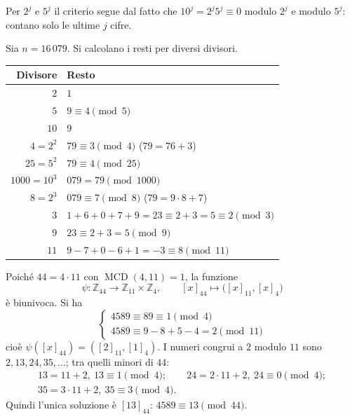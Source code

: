 \documentclass[11pt,a4paper]{article}
\begin{document}
\begin{osservazione}
Per $2^j$ e $5^j$ il criterio segue dal fatto che $10^j = 2^j 5^j \equiv 0$ modulo $2^j$ e modulo $5^j$: contano solo le ultime $j$ cifre.
\end{osservazione}

\begin{esempio}
Sia $n = 16\,079$. Si calcolano i resti per diversi divisori.
\begin{center}
\begin{tabular}{rl}
\toprule
Divisore & Resto \\
\midrule
$2$ & $1$ \\
$5$ & $9 \equiv 4 \pmod 5$ \\
$10$ & $9$ \\
$4 = 2^2$ & $79 \equiv 3 \pmod 4$ \quad ($79 = 76 + 3$) \\
$25 = 5^2$ & $79 \equiv 4 \pmod{25}$ \\
$1000 = 10^3$ & $079 = 79 \pmod{1000}$ \\
$8 = 2^3$ & $079 \equiv 7 \pmod 8$ \quad ($79 = 9\cdot 8 + 7$) \\
$3$ & $1 + 6 + 0 + 7 + 9 = 23 \equiv 2 + 3 = 5 \equiv 2 \pmod 3$ \\
$9$ & $23 \equiv 2 + 3 = 5 \pmod 9$ \\
$11$ & $9 - 7 + 0 - 6 + 1 = -3 \equiv 8 \pmod{11}$ \\
\bottomrule
\end{tabular}
\end{center}
\end{esempio}

\begin{esempio}
Poiché $44 = 4\cdot 11$ con $\operatorname{MCD}(4, 11) = 1$, la funzione
\[
  \psi : \mathbb{Z}_{44} \to \mathbb{Z}_{11}\times\mathbb{Z}_4, \qquad [x]_{44} \mapsto \big([x]_{11}, [x]_4\big)
\]
è biunivoca. Si ha
\[
  \begin{cases} 4589 \equiv 89 \equiv 1 \pmod 4 \\ 4589 \equiv 9 - 8 + 5 - 4 = 2 \pmod{11} \end{cases}
\]
cioè $\psi([x]_{44}) = ([2]_{11}, [1]_4)$. I numeri congrui a $2$ modulo $11$ sono $2, 13, 24, 35, \dots$; tra quelli minori di $44$:
\[
  \begin{gathered}
  13 = 11 + 2,\ 13 \equiv 1 \pmod 4; \qquad 24 = 2\cdot 11 + 2,\ 24 \equiv 0 \pmod 4;\\
  35 = 3\cdot 11 + 2,\ 35 \equiv 3 \pmod 4 .
  \end{gathered}
\]
Quindi l'unica soluzione è $[13]_{44}$: $4589 \equiv 13 \pmod{44}$.
\end{esempio}
\end{document}
